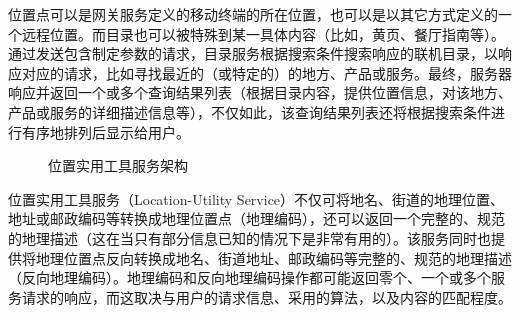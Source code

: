 \documentclass{article}
\begin{document}
\begin{CJK}{UTF8}{gbsn}
	位置点可以是网关服务定义的移动终端的所在位置，也可以是以其它方式定义的一个远程位置。而目录也可以被特殊到某一具体内容（比如，黄页、餐厅指南等）。通过发送包含制定参数的请求，目录服务根据搜索条件搜索响应的联机目录，以响应对应的请求，比如寻找最近的（或特定的）的地方、产品或服务。最终，服务器响应并返回一个或多个查询结果列表（根据目录内容，提供位置信息，对该地方、产品或服务的详细描述信息等），不仅如此，该查询结果列表还将根据搜索条件进行有序地排列后显示给用户。
	
	\begin{figure}[htbp]
		\centering
		\hspace{10pt}
		\caption{位置实用工具服务架构}
	\end{figure}

	位置实用工具服务（Location-Utility Service）不仅可将地名、街道的地理位置、地址或邮政编码等转换成地理位置点（地理编码），还可以返回一个完整的、规范的地理描述（这在当只有部分信息已知的情况下是非常有用的）。该服务同时也提供将地理位置点反向转换成地名、街道地址、邮政编码等完整的、规范的地理描述（反向地理编码）。地理编码和反向地理编码操作都可能返回零个、一个或多个服务请求的响应，而这取决与用户的请求信息、采用的算法，以及内容的匹配程度。


\end{CJK}
\end{document}
